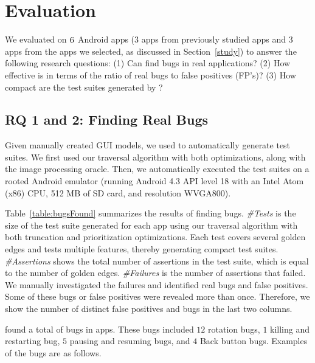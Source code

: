 \section{Evaluation}
\label{evaluation}

We evaluated \tool{} on $\textsc{6}$ Android apps ($3$ apps from previously studied apps and $3$ apps from the apps
we selected, as discussed in Section~\ref{study}) to answer the
following research questions:
(1) Can \tool{} find bugs in real applications?
(2) How effective is \tool{} in terms of the ratio of real bugs to false positives (FP's)?
(3) How compact are the test suites generated by \tool?

\subsection{RQ 1 and 2: Finding Real Bugs}
Given manually created GUI models, we used \tool{} to automatically
generate test suites. We first used our traversal algorithm with both optimizations, along with
the image processing oracle. Then, we automatically executed the test
suites on a rooted Android emulator (running Android 4.3 API level 18
with an Intel Atom (x86) CPU, 512 MB of SD card, and resolution
WVGA800).



Table~\ref{table:bugsFound} summarizes the results of finding bugs.
\emph{\#Tests} is the size of the test suite generated for each app
using our traversal algorithm with both truncation and prioritization
optimizations. Each test covers several golden edges and tests multiple features, 
thereby generating compact test suites.
\emph{\#Assertions} shows the total number of assertions in the test
suite, which is equal to the number of golden edges. \emph{\#Failures} is the number of assertions that failed. We
manually investigated the failures and identified real bugs and false
positives. Some of these bugs or false positives were revealed more
than once. Therefore, we show the number of distinct false positives
and bugs in the last two columns.

\tool{} found a total of \NumBugs{} bugs in \NumApps{} apps. These bugs included $12$ rotation bugs, $1$ killing and restarting bug, $5$ pausing and resuming bugs, and $4$ Back button bugs. Examples of the bugs are as follows.

